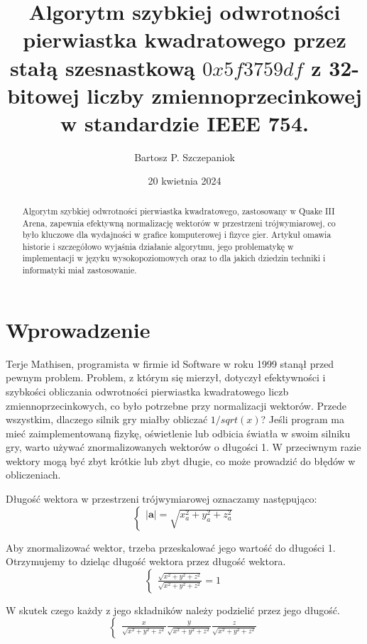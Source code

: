 \documentclass[12pt]{article}
\title{Algorytm szybkiej odwrotności pierwiastka kwadratowego przez stałą szesnastkową $0x5f3759df$ z 32-bitowej liczby zmiennoprzecinkowej w standardzie IEEE 754.}
\author{Bartosz P. Szczepaniok}
\date{20 kwietnia 2024}
\begin{document}
\maketitle

\begin{abstract}
\noindent Algorytm szybkiej odwrotności pierwiastka kwadratowego, zastosowany w Quake III Arena, zapewnia efektywną normalizację wektorów w przestrzeni trójwymiarowej, co było kluczowe dla wydajności w grafice komputerowej i fizyce gier.  Artykuł omawia historie i szczegółowo wyjaśnia działanie algorytmu, jego problematykę w implementacji w języku wysokopoziomowych oraz to dla jakich dziedzin techniki i informatyki miał zastosowanie.
\end{abstract}

\section{Wprowadzenie}
Terje Mathisen, programista w firmie id Software w roku 1999 stanął przed pewnym problem. Problem, z którym się mierzył, dotyczył efektywności i szybkości obliczania odwrotności pierwiastka kwadratowego liczb zmiennoprzecinkowych, co było potrzebne przy normalizacji wektorów. Przede wszystkim, dlaczego silnik gry miałby obliczać $1/sqrt(x)$? Jeśli program ma mieć zaimplementowaną fizykę, oświetlenie lub odbicia światła w swoim silniku gry, warto używać znormalizowanych wektorów o długości 1. W przeciwnym razie wektory mogą być zbyt krótkie lub zbyt długie, co może prowadzić do błędów w obliczeniach. 

\noindent Długość wektora w przestrzeni trójwymiarowej oznaczamy następująco:
$$ \begin{cases}
|\mathbf{a}| = \sqrt{x_a^2 + y_a^2 + z_a^2}
\end{cases} $$

\noindent Aby znormalizować wektor, trzeba przeskalować jego wartość do długości 1. Otrzymujemy to dzieląc długość wektora przez długość wektora. 
$$ \begin{cases}
\frac{\sqrt{x^2 + y^2 + z^2}}{\sqrt{x^2 + y^2 + z^2}} = 1
\end{cases} $$

\noindent W skutek czego każdy z jego składników należy podzielić przez jego długość. 
$$ \begin{cases}
\frac{x}{\sqrt{x^2 + y^2 + z^2}}
\frac{y}{\sqrt{x^2 + y^2 + z^2}}
\frac{z}{\sqrt{x^2 + y^2 + z^2}}
\end{cases} $$
\end{document}
